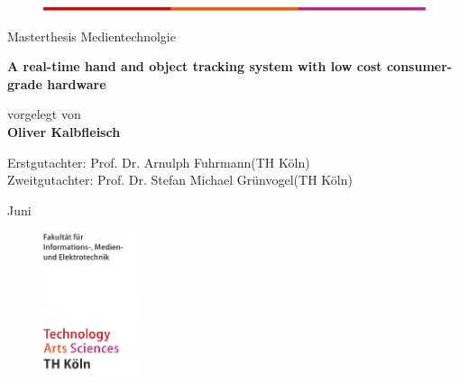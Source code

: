 \begin{titlepage}

\begin{center}
\begin{figure}[!ht]
	\centering
		\includegraphics[width=\textwidth]{images/Th_color_bar.png}
\end{figure}
\end{center}
\begin{flushleft}
\begin{normalsize}
Masterthesis Medientechnolgie\\
\end{normalsize}
\vspace{0.5cm}
\begin{huge}
\textbf{A real-time hand and object tracking system with low cost consumer-grade hardware}
\end{huge}
\end{flushleft}
\vspace{1.0cm}
\begin{flushleft}
\begin{small}
vorgelegt von\\ 
\vspace{0.3cm}
\textbf{Oliver Kalbfleisch} \\
\end{small}
\end{flushleft}
\vspace{2.0cm}
\begin{flushleft}
\begin{small}
Erstgutachter: Prof. Dr. Arnulph Fuhrmann(TH Köln) \\[1.0em]
Zweitgutachter: Prof. Dr. Stefan Michael Grünvogel(TH Köln)
\end{small}
\end{flushleft}
\vspace{1.5cm}
\begin{flushleft}
\begin{small}
Juni \the\year
\end{small}
\end{flushleft}
\begin{figure}[!ht]
\begin{flushright}
\includegraphics[width=0.25\textwidth]{images/TH_bottom_logo.png}

\end{flushright}
\end{figure}
\end{titlepage}

